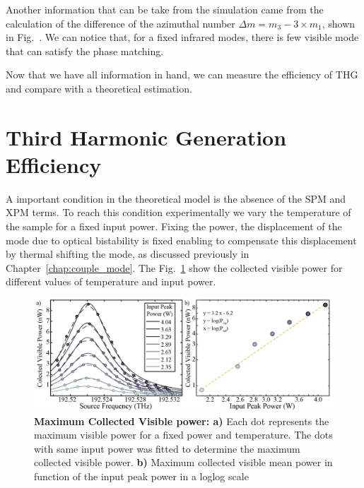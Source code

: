 Another information that can be take from the simulation came from the calculation of the difference of the azimuthal number $\Delta m = m_3 - 3\times m_1$, shown in Fig.~. We can notice that, for a fixed infrared modes, there is few visible mode that can satisfy the phase matching.   

Now that we have all information in hand, we can measure the efficiency of THG and compare with a theoretical estimation. 

\section{Third Harmonic Generation Efficiency}
A important condition in the theoretical model is the absence of the SPM and XPM terms. To reach this condition experimentally we vary the temperature of the sample for a fixed input power. Fixing the power, the displacement of the mode due to optical bistability is fixed enabling to compensate this displacement by thermal shifting the mode, as discussed previously in Chapter~\ref{chap:couple_mode}. The Fig.~\ref{fig:max_thg} show the collected visible power for different values of temperature and input power.
\begin{figure}[h]
    \centering
    \includegraphics[width = 16cm]{figuras/Dissertation_max_thg.jpg}
    \caption{\textbf{Maximum Collected Visible power: a)} Each dot represents the maximum visible power for a fixed power and temperature. The dots with same input power was fitted to determine the maximum collected visible power. \textbf{b)} Maximum collected visible mean power in function of the input peak power in a loglog scale}
    \label{fig:max_thg}
\end{figure}


